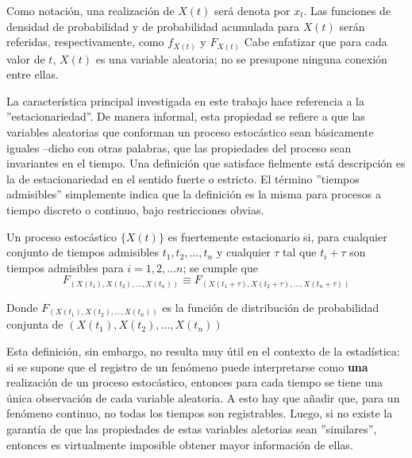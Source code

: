 Como notaci\'on, una realizaci\'on de $X(t)$ ser\'a denota por $x_t$. 
Las funciones de densidad de probabilidad y de probabilidad acumulada para $X(t)$ ser\'an
referidas, respectivamente, como $f_{X(t)}$ y $F_{X(t)}$
Cabe enfatizar que para cada valor de $t$,
$X(t)$ es una variable aleatoria; no se presupone ninguna conexi\'on entre ellas.


La caracter\'istica principal 
investigada en este trabajo hace referencia a la ''estacionariedad''. De manera 
informal, esta propiedad se refiere a que las variables aleatorias que conforman un proceso
estoc\'astico sean b\'asicamente iguales --dicho con otras palabras, que las propiedades
del proceso sean invariantes en el tiempo. 
Una definici\'on que satisface fielmente est\'a descripci\'on es la de estacionariedad 
en el sentido fuerte o estricto.
El t\'ermino ''tiempos admisibles'' simplemente indica que la definici\'on es la misma para
procesos a tiempo discreto o continuo, bajo restricciones obvias.

\begin{defn}
Un proceso estoc\'astico $\{ X(t) \}$ es fuertemente estacionario si, para cualquier 
conjunto de tiempos admisibles $t_1,t_2,\dots,t_n$ y cualquier $\tau$ tal que 
 $t_i+\tau$ son tiempos admisibles para $i = 1, 2, \dots n$;
se cumple que
\begin{equation*}
F_{\left(X(t_1),X(t_2),\dots,X(t_n)\right) }
\equiv
F_{\left(X(t_1+\tau),X(t_2+\tau),\dots,X(t_n+\tau)\right)}
\end{equation*}

Donde $F_{\left(X(t_1),X(t_2),\dots,X(t_n)\right) }$ es la funci\'on de distribuci\'on de
probabilidad conjunta de $\left(X(t_1),X(t_2),\dots,X(t_n)\right)$
\end{defn}

Esta definici\'on, sin embargo, no resulta muy \'util en el contexto de la estad\'istica:
si se supone que el registro de un fen\'omeno puede interpretarse como \textbf{una} 
realizaci\'on de
un proceso estoc\'astico, entonces para cada tiempo se tiene una \'unica observaci\'on
de cada variable aleatoria. A esto hay que a\~nadir que, para un fen\'omeno continuo,
no todas los tiempos son registrables.
Luego, si no existe la garant\'ia de que las propiedades de estas variables aletorias sean
''similares'', entonces es virtualmente imposible obtener mayor informaci\'on de ellas.

